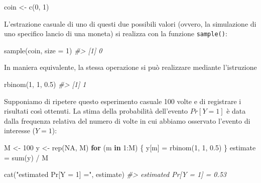 \documentclass[
  11pt,
]{krantz}
\makeatletter
\newenvironment{Shaded}{\begin{snugshade}}{\end{snugshade}}
\newcommand{\AttributeTok}[1]{\textcolor[rgb]{0.61,0.61,0.61}{#1}}
\newcommand{\CommentTok}[1]{\textcolor[rgb]{0.37,0.37,0.37}{\textit{#1}}}
\newcommand{\ConstantTok}[1]{\textcolor[rgb]{0,0,0}{#1}}
\newcommand{\ControlFlowTok}[1]{\textcolor[rgb]{0.27,0.27,0.27}{\textbf{#1}}}
\newcommand{\DecValTok}[1]{\textcolor[rgb]{0.06,0.06,0.06}{#1}}
\newcommand{\FloatTok}[1]{\textcolor[rgb]{0.06,0.06,0.06}{#1}}
\newcommand{\FunctionTok}[1]{\textcolor[rgb]{0,0,0}{#1}}
\newcommand{\NormalTok}[1]{#1}
\newcommand{\OtherTok}[1]{\textcolor[rgb]{0.37,0.37,0.37}{#1}}
\newcommand{\SpecialCharTok}[1]{\textcolor[rgb]{0,0,0}{#1}}
\newcommand{\StringTok}[1]{\textcolor[rgb]{0.5,0.5,0.5}{#1}}
\newenvironment{kframe}{%
\medskip{}
\setlength{\fboxsep}{.8em}
 \def\at@end@of@kframe{}%
 \ifinner\ifhmode%
  \def\at@end@of@kframe{\end{minipage}}%
  \begin{minipage}{\columnwidth}%
 \fi\fi%
 \def\FrameCommand##1{\hskip\@totalleftmargin \hskip-\fboxsep
 \colorbox{shadecolor}{##1}\hskip-\fboxsep
     \hskip-\linewidth \hskip-\@totalleftmargin \hskip\columnwidth}%
 \MakeFramed {\advance\hsize-\width
   \@totalleftmargin\z@ \linewidth\hsize
   \@setminipage}}%
 {\par\unskip\endMakeFramed%
 \at@end@of@kframe}
\renewenvironment{Shaded}{\begin{kframe}}{\end{kframe}}
\theoremstyle{definition}
\theoremstyle{definition}
\theoremstyle{definition}
\theoremstyle{definition}
\theoremstyle{remark}
\makeatother
\begin{document}
\begin{Shaded}
\begin{Highlighting}[]
\NormalTok{coin }\OtherTok{\textless{}{-}} \FunctionTok{c}\NormalTok{(}\DecValTok{0}\NormalTok{, }\DecValTok{1}\NormalTok{)}
\end{Highlighting}
\end{Shaded}

\noindent L'estrazione casuale di uno di questi due possibili valori (ovvero, la simulazione di uno specifico lancio di una moneta) si realizza con la funzione \texttt{sample()}:

\begin{Shaded}
\begin{Highlighting}[]
\FunctionTok{sample}\NormalTok{(coin, }\AttributeTok{size =} \DecValTok{1}\NormalTok{)}
\CommentTok{\#\textgreater{} [1] 0}
\end{Highlighting}
\end{Shaded}

\noindent In maniera equivalente, la stessa operazione si può realizzare mediante l'istruzione

\begin{Shaded}
\begin{Highlighting}[]
\FunctionTok{rbinom}\NormalTok{(}\DecValTok{1}\NormalTok{, }\DecValTok{1}\NormalTok{, }\FloatTok{0.5}\NormalTok{)}
\CommentTok{\#\textgreater{} [1] 1}
\end{Highlighting}
\end{Shaded}

Supponiamo di ripetere questo esperimento casuale 100 volte e di registrare i risultati così ottenuti. La stima della probabilità dell'evento \(Pr[Y = 1]\) è data dalla frequenza relativa del numero di volte in cui abbiamo osservato l'evento di interesse (\(Y = 1\)):

\begin{Shaded}
\begin{Highlighting}[]
\NormalTok{M }\OtherTok{\textless{}{-}} \DecValTok{100}
\NormalTok{y }\OtherTok{\textless{}{-}} \FunctionTok{rep}\NormalTok{(}\ConstantTok{NA}\NormalTok{, M)}
\ControlFlowTok{for}\NormalTok{ (m }\ControlFlowTok{in} \DecValTok{1}\SpecialCharTok{:}\NormalTok{M) \{}
\NormalTok{  y[m] }\OtherTok{=} \FunctionTok{rbinom}\NormalTok{(}\DecValTok{1}\NormalTok{, }\DecValTok{1}\NormalTok{, }\FloatTok{0.5}\NormalTok{)}
\NormalTok{\}}
\NormalTok{estimate }\OtherTok{=} \FunctionTok{sum}\NormalTok{(y) }\SpecialCharTok{/}\NormalTok{ M}

\FunctionTok{cat}\NormalTok{(}\StringTok{"estimated Pr[Y = 1] ="}\NormalTok{, estimate)}
\CommentTok{\#\textgreater{} estimated Pr[Y = 1] = 0.53}
\end{Highlighting}
\end{Shaded}
\end{document}
